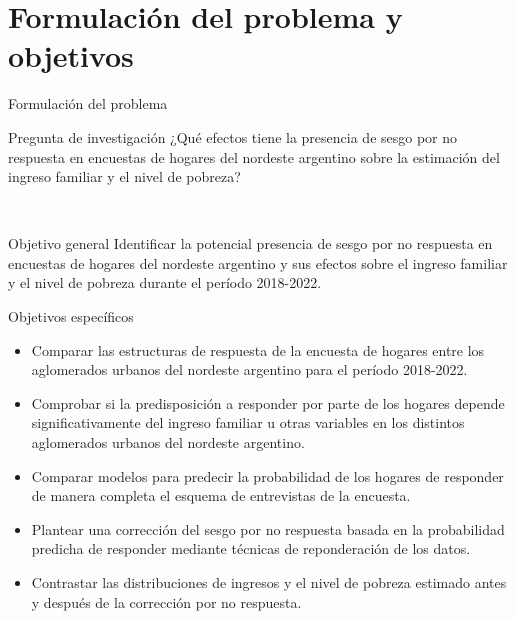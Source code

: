 \documentclass[10pt]{beamer}
\begin{document}
\section{Formulación del problema y objetivos}

\begin{frame}[fragile]{Formulación del problema}


    \begin{block}{Pregunta de investigación}
        ¿Qué efectos tiene la presencia de sesgo por no respuesta en encuestas de hogares del nordeste argentino sobre la estimación del ingreso familiar y el nivel de pobreza?
    \end{block}

\

    \begin{block}{Objetivo general}
       Identificar la potencial presencia de sesgo por no respuesta en encuestas de hogares del nordeste argentino y sus efectos sobre el ingreso familiar y el nivel de pobreza durante el período 2018-2022.
     \end{block}
\end{frame}

\begin{frame}[fragile]{Objetivos específicos}

\begin{itemize}
    \item Comparar las \alert{estructuras de respuesta} de la encuesta de hogares \alert{entre los aglomerados} urbanos del nordeste argentino para el período 2018-2022.
    \item Comprobar si la \alert{predisposición a responder} por parte de los hogares \alert{depende significativamente del ingreso familiar} u otras variables en los distintos aglomerados urbanos del nordeste argentino.
    \item Comparar \alert{modelos para predecir} la probabilidad de los hogares de responder de manera completa el esquema de entrevistas de la encuesta.
    \item Plantear una \alert{corrección del sesgo por no respuesta} basada en la probabilidad predicha de responder mediante técnicas de reponderación de los datos.
    \item  \alert{Contrastar las distribuciones} de ingresos y el nivel de pobreza estimado antes y después de la corrección por no respuesta.
\end{itemize}

\end{frame}
\end{document}
